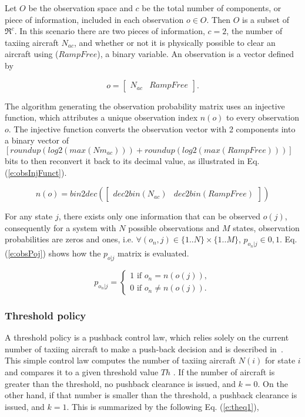 \documentclass[letterpaper]{article}
\begin{document}
Let $O$ be the observation space and $c$ be the total number of components, or piece of information, included in each observation $o \in O$. 
Then $O$ is a subset of $\Re^c$. In this scenario there are two pieces of information, $c = 2$, the number of taxiing aircraft $N_{ac}$, 
and whether or not it is physically possible to clear an aircraft using ($RampFree$), a binary variable.
An observation is a vector defined by

\begin{equation} \label{e:oVect0}
o = \begin{bmatrix} N_{ac} & RampFree \end{bmatrix}.
\end{equation}

The algorithm generating the observation probability matrix uses an injective function,
 which attributes a unique observation index $n(o)$ to every observation $o$. 
 The injective function converts the observation vector with 2 components into a binary vector of $[roundup(log2(max(Nm_{ac})))+roundup(log2(max(RampFree)))]$ bits to then reconvert it back to its decimal value, as illustrated in Eq. (\ref{e:obsInjFunct}).

\begin{equation}
\label{e:obsInjFunct}
n(o) = bin2dec(\begin{bmatrix} dec2bin(N_{ac}) & dec2bin(RampFree)\end{bmatrix})
\end{equation}

For any state $j$, there exists only one information that can be observed $o(j)$, consequently for a system with $N$ possible observations and $M$ states, observation probabilities are zeros and ones, i.e. $\forall (o_n,j) \in \{1..N\}\times \{1..M\}$, $p_{o_n|j} \in {0,1}$. Eq. (\ref{e:obsPoj}) shows how the $p_{o|j}$ matrix is evaluated.

\begin{equation}\label{e:obsPoj}
p_{o_n|j} =
\begin{cases}
1 \text{ if $o_n = n(o(j))$}, \\
0 \text{ if $o_n \neq n(o(j))$}.
\end{cases}
\end{equation}



\subsubsection{Threshold policy}
A threshold policy is a pushback control law, which relies solely on the current number of taxiing aircraft to make a push-back decision and is described in~\cite{log99,SKB:11}.
 This simple control law computes the number of taxiing aircraft  $N(i)$ for state $i$ and compares it to a given threshold value $Th$ \cite{log99}.
  If the number of aircraft is greater than the threshold, no pushback clearance is issued, and $k=0$. On the other hand, if that number is smaller 
  than the threshold, a pushback clearance is issued, and $k=1$. This is summarized by the following Eq. (\ref{e:theq1}),
\end{document}
